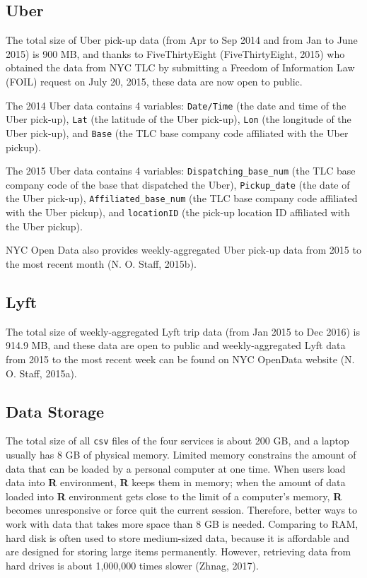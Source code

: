 \documentclass[12pt,twoside]{reedthesis}
\theoremstyle{definition}
\theoremstyle{definition}
\theoremstyle{definition}
\theoremstyle{remark}
\begin{document}
\subsection{Uber}\label{uber-1}

The total size of Uber pick-up data (from Apr to Sep 2014 and from Jan
to June 2015) is 900 MB, and thanks to FiveThirtyEight (FiveThirtyEight,
2015) who obtained the data from NYC TLC by submitting a Freedom of
Information Law (FOIL) request on July 20, 2015, these data are now open
to public.

The 2014 Uber data contains 4 variables: \texttt{Date/Time} (the date
and time of the Uber pick-up), \texttt{Lat} (the latitude of the Uber
pick-up), \texttt{Lon} (the longitude of the Uber pick-up), and
\texttt{Base} (the TLC base company code affiliated with the Uber
pickup).

The 2015 Uber data contains 4 variables: \texttt{Dispatching\_base\_num}
(the TLC base company code of the base that dispatched the Uber),
\texttt{Pickup\_date} (the date of the Uber pick-up),
\texttt{Affiliated\_base\_num} (the TLC base company code affiliated
with the Uber pickup), and \texttt{locationID} (the pick-up location ID
affiliated with the Uber pickup).

NYC Open Data also provides weekly-aggregated Uber pick-up data from
2015 to the most recent month (N. O. Staff, 2015b).

\subsection{Lyft}\label{lyft-1}

The total size of weekly-aggregated Lyft trip data (from Jan 2015 to Dec
2016) is 914.9 MB, and these data are open to public and
weekly-aggregated Lyft data from 2015 to the most recent week can be
found on NYC OpenData website (N. O. Staff, 2015a).

\subsection{Data Storage}\label{data-storage}

The total size of all \texttt{csv} files of the four services is about
200 GB, and a laptop usually has 8 GB of physical memory. Limited memory
constrains the amount of data that can be loaded by a personal computer
at one time. When users load data into \textbf{R} environment,
\textbf{R} keeps them in memory; when the amount of data loaded into
\textbf{R} environment gets close to the limit of a computer's memory,
\textbf{R} becomes unresponsive or force quit the current session.
Therefore, better ways to work with data that takes more space than 8 GB
is needed. Comparing to RAM, hard disk is often used to store
medium-sized data, because it is affordable and are designed for storing
large items permanently. However, retrieving data from hard drives is
about 1,000,000 times slower (Zhnag, 2017).
\end{document}
